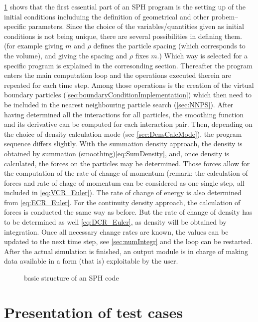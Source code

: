 \documentclass{report}
\begin{document}
\ref{fig:BasicSphCode} shows that the first essential part of an SPH program is the setting up of the initial conditions includuing the definition of geometrical and other
probem--specific parameters. Since the choice of the variables/quantities given as 
initial conditions is not being unique, there are several possibilities in defining 
them. (for example giving $m$ and $\rho$ defines the particle spacing (which corresponds
to the volume), and giving the spacing and $\rho$ fixes $m$.) Which way is selected for 
a specific program is explained in the corresonding section. 
Thereafter the program enters the main computation loop and the operations executed 
therein are repeated for each time step. Among those operations is the creation of the 
virtual boundary particles (\ref{sec:boundaryConditionImplementation}) which then 
need to be included in the nearest neighbouring particle search (\ref{sec:NNPS}). 
After having determined all the interactions for all particles, the smoothing function 
and its derivative can be computed for each interaction pair. Then, depending on the 
choice of density calculation mode (see \ref{sec:DensCalcMode}), the program sequence differs slightly. 
With the summation density approach, the density is obtained by summation 
(smoothing)\ref{eq:SumDensity}, and, once density is calculated, the forces on the 
particles may be determined. Those forces allow for the computation of the rate
of change of momentum (remark: the calculation of forces and rate of chage of  momentum 
can be considered as one single step, all included in \ref{eq:VCR_Euler}). The 
rate of change of energy is also determined from \ref{eq:ECR_Euler}.
For the continuity density approach, the calculation of forces is conducted the same way as before. But the rate of change of density 
has to be determined as well \ref{eq:DCR_Euler}, as density will be obtained by integration. 
Once all necessary change rates are known, the values can be updated to the next time step, see \ref{sec:numIntegr} and the loop can be restarted. After the actual simulation is finished, an output module is in charge of making data available in a form (that is) exploitable by the user.


\begin{figure}[h]
  \centering
  \caption{basic structure of an SPH code}
  \label{fig:BasicSphCode}
\end{figure}



\section{Presentation of test cases}
\label{sec:testCases}
 
\end{document}
